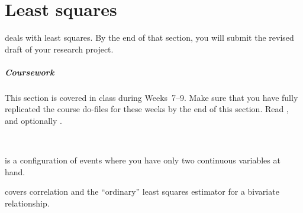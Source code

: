 %
%
\chapter{Least squares}%
  \label{ch:ols}%
  \begin{mybox}
     deals with least squares. By the end of that section, you will submit the revised draft of your research project.%
    \paragraph{Coursework} %
    This section is covered in class during Weeks~7--9. Make sure that you have fully replicated the course do-files for these weeks by the end of this section. Read  \citeauthor[ch.~8 and 13]{Urdan:2010a}, and optionally \citeauthor[ch.~3--4]{FeinsteinThomas:2002d}.%
  \end{mybox}\\[4em]%
  \startcontents[chapters]%
	\newpage

 is a configuration of events where you have only two continuous variables at hand.%

 covers correlation and the ``ordinary'' least squares estimator for a bivariate relationship.%

%
%
%
%
%
%

\stopcontents[chapters]

%
%
